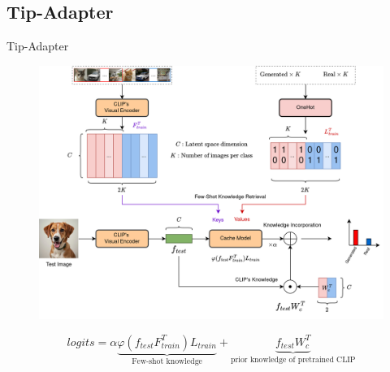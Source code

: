 \documentclass[11pt,compress]{beamer} %
\begin{document}

\subsection{Tip-Adapter}
\begin{frame}{Tip-Adapter}
  \begin{figure}
    \includegraphics[height=.7\textheight]{img/tip_adapter_binary.png}
  \end{figure}
  \begin{equation}
    logits = \alpha\underbrace{\varphi(f_{test}F_{train}^T)L_{train}}_{\text{Few-shot knowledge}} + \underbrace{f_{test}W_c^T}_{\text{prior knowledge of pretrained CLIP}} \nonumber
  \end{equation}
\end{frame}
\end{document}
